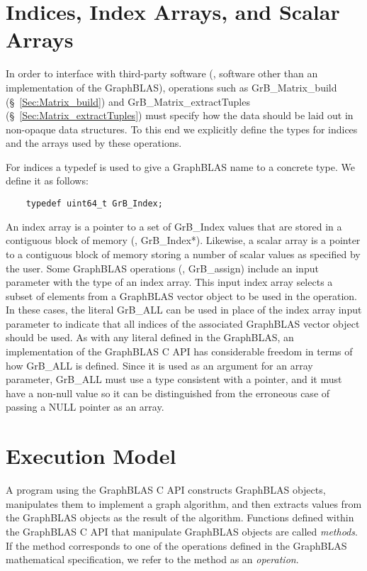 \section{Indices, Index Arrays, and Scalar Arrays}

In order to interface with third-party software (\ie, software other than
an implementation of the GraphBLAS), operations 
such as {\sf GrB\_Matrix\_build} (\S~\ref{Sec:Matrix_build}) and
{\sf GrB\_Matrix\_extractTuples} (\S~\ref{Sec:Matrix_extractTuples}) must specify
how the data should be laid out in  non-opaque data structures.  To 
this end we explicitly define the types for indices and the arrays 
used by these operations.

For indices a {\sf typedef} is used to give a GraphBLAS name to a concrete type. We define it as follows:

\begin{verbatim}
    typedef uint64_t GrB_Index;
\end{verbatim}

An index array is a pointer to a set of {\sf GrB\_Index} values that are 
stored in a contiguous block of memory (\ie, {\sf GrB\_Index*}).
Likewise, a scalar array is a pointer to a contiguous block of memory 
storing a number of scalar values as specified by the user.
Some GraphBLAS operations (\eg, {\sf GrB\_assign})  include an input parameter with the type of an index array. 
This input index array selects a subset of elements from a GraphBLAS vector object to be used in the operation.
In these cases, the literal {\sf GrB\_ALL} 
can be used in place of the index array input parameter to indicate that all indices 
of the associated GraphBLAS vector object should be used.
As with any literal defined in the GraphBLAS, an implementation of the GraphBLAS C API has considerable 
freedom in terms of how {\sf GrB\_ALL} is defined.  Since it is used as an argument for an array 
parameter, {\sf GrB\_ALL} must use a type consistent with a pointer, and it must have a non-null
value so it can be distinguished from the erroneous case of passing a NULL pointer as an array.

\section{Execution Model}
\label{Sec:ExecutionModel}

A program using the GraphBLAS C API constructs GraphBLAS objects,
manipulates them to implement a graph algorithm, and then extracts
values from the GraphBLAS objects as the result of the algorithm.
Functions defined within the GraphBLAS C API that manipulate GraphBLAS
objects are called \emph{methods}.  If the method corresponds to one
of the operations defined in the GraphBLAS mathematical specification,
we refer to the method as an \emph{operation}.

